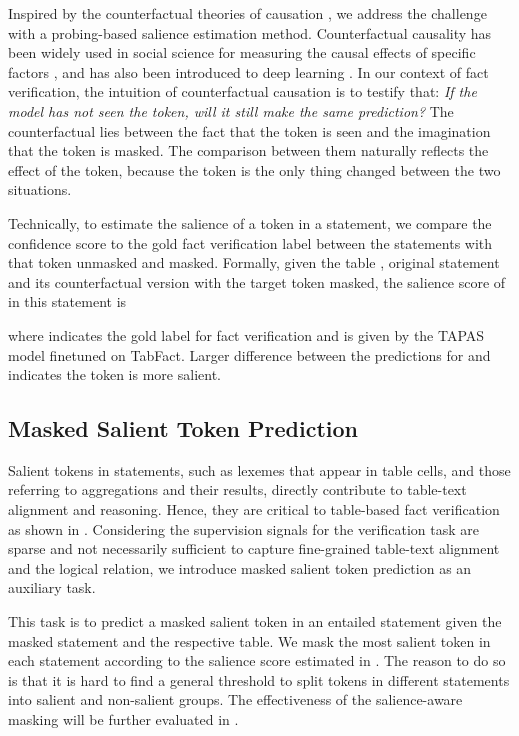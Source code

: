 \documentclass[11pt]{article}
\begin{document}
Inspired by the counterfactual theories of causation \cite{pearl2009causality, lewis2013counterfactuals}, we address the challenge with a probing-based salience estimation method.
Counterfactual causality has been widely used in social science for measuring the causal effects of specific factors \cite{tetlock1997counterfactual, bradycausation, morgan2015counterfactuals}, and has also been introduced to deep learning \cite{tang2020unbiased, niu2020counterfactual}.
In our context of fact verification, the intuition of counterfactual causation is to testify that: 
\textit{If the model has not seen the token, will it still make the same prediction?}
The counterfactual lies between the fact that the token is seen and the imagination that the token is masked.
The comparison between them naturally reflects the effect of the token, because the token is the only thing changed between the two situations.


Technically, to estimate the salience of a token in a statement, 
we compare the confidence score to the gold fact verification label between the statements with that token unmasked and masked.
Formally, given the table , original statement  and its counterfactual version  with the target token  masked, the salience score of  in this statement is
 
where  indicates the gold label for fact verification and  is given by the TAPAS model finetuned on TabFact. 
Larger difference between the predictions for  and  indicates the token is more salient.


\subsection{Masked Salient Token Prediction}\label{sec:token_prediction}




Salient tokens in statements, such as lexemes that appear in table cells, and those referring to aggregations and their results, directly contribute to table-text alignment and reasoning. 
Hence, they are critical to table-based fact verification as shown in .
Considering the supervision signals for the verification task are sparse and not necessarily sufficient to capture fine-grained table-text alignment
and the logical relation, we introduce masked salient token prediction as an auxiliary task.

This task is to predict a masked salient token in an entailed statement given the masked statement and the respective table.
We mask the most salient token in each statement according to the salience score estimated in .
The reason to do so is that it is hard to find a general threshold to split tokens in different statements into salient and non-salient groups.
The effectiveness of the salience-aware masking will be further evaluated in .
\end{document}
